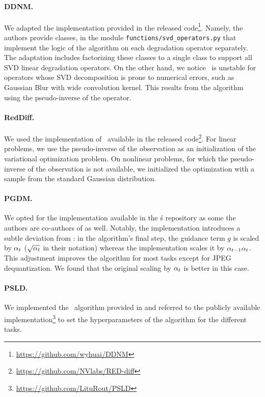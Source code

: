 \paragraph*{DDNM.}
We adapted the implementation provided in the released code\footnote{\url{https://github.com/wyhuai/DDNM}}.
Namely, the authors provide classes, in the module \texttt{functions\slash svd\_operators.py} that implement the logic of the algorithm on each degradation operator separately.
The adaptation includes factorizing these classes to a single class to support all SVD linear degradation operators.
On the other hand, we notice \ddnm\ is unstable for operators whose SVD decomposition is prone to numerical errors, such as Gaussian Blur with wide convolution kernel. This results from the algorithm using the pseudo-inverse of the operator.

\paragraph*{RedDiff.}
We used the implementation of \reddiff\ available in the released code\footnote{\url{https://github.com/NVlabs/RED-diff}}.
For linear problems, we use the pseudo-inverse of the observation as an initialization of the variational optimization problem. 
On nonlinear problems, for which the pseudo-inverse of the observation is not available, we initialized the optimization with a sample from the standard Gaussian distribution. 

\paragraph*{PGDM.}
We opted for the implementation available in the \reddiff\'s repository as some the authors are co-authors of \pgdm as well.
Notably, the implementation introduces a subtle deviation from \citet[Algorithm 1]{song2022pseudoinverse}: in the algorithm's final step, the guidance term $g$ is scaled by $\alpha_t$ ($\sqrt{\alpha_t}$ in their notation) whereas the implementation scales it by $\alpha_{t-1}\alpha_t$.
This adjustment improves the algorithm for most tasks except for JPEG dequantization. We found that the original scaling by $\alpha_t$ is better in this case.

\paragraph*{PSLD.}
We implemented the \psld\ algorithm provided in \citet[Algorithm 2]{rout2024solving} and referred to the publicly available implementation\footnote{\url{https://github.com/LituRout/PSLD}} to set the hyperparameters of the algorithm for the different tasks.

